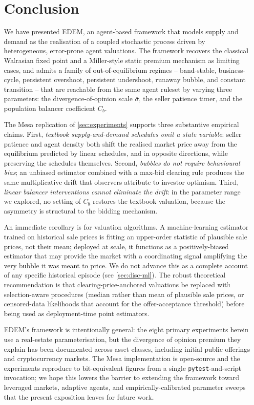 \section{Conclusion}
\label{sec:conclusion}

We have presented EDEM, an agent-based framework that models supply
and demand as the realisation of a coupled stochastic process driven
by heterogeneous, error-prone agent valuations. The framework
recovers the classical Walrasian fixed point and a Miller-style
static premium mechanism as limiting cases, and admits a family of
out-of-equilibrium regimes -- band-stable, business-cycle, persistent
overshoot, persistent undershoot, runaway bubble, and constant
transition -- that are reachable from the same agent ruleset by
varying three parameters: the divergence-of-opinion scale
$\bar{\sigma}$, the seller patience timer, and the population
balancer coefficient $C_{b}$.

The Mesa replication of \cref{sec:experiments}
supports three substantive empirical claims. First,
\emph{textbook supply-and-demand schedules omit a state variable}:
seller patience and agent density both shift the realised market
price away from the equilibrium predicted by linear schedules, and
in opposite directions, while preserving the schedules themselves.
Second, \emph{bubbles do not require behavioural bias}; an unbiased
estimator combined with a max-bid clearing rule produces the same
multiplicative drift that observers attribute to investor optimism.
Third, \emph{linear balancer interventions cannot eliminate the
drift}: in the parameter range we explored, no setting of $C_{b}$
restores the textbook valuation, because the asymmetry is structural
to the bidding mechanism.

An immediate corollary is for valuation algorithms. A
machine-learning estimator trained on historical sale prices is
fitting an upper-order statistic of plausible sale prices, not their
mean; deployed at scale, it functions as a positively-biased
estimator that may provide the market with a coordinating signal
amplifying the very bubble it was meant to price. We do not advance
this as a complete account of any specific historical episode (see
\cref{sec:disc-ml}). The robust theoretical recommendation is that
clearing-price-anchored valuations be replaced with selection-aware
procedures (median rather than mean of plausible sale prices, or
censored-data likelihoods that account for the offer-acceptance
threshold) before being used as deployment-time point estimators.

EDEM's framework is intentionally general: the eight primary experiments
herein use a real-estate parameterisation, but the divergence of
opinion premium they explain has been documented across asset
classes, including initial public offerings
\citep{miller1977,doukas2006} and cryptocurrency markets. The Mesa
implementation is open-source and the experiments reproduce
to bit-equivalent figures from a single \texttt{pytest}-and-script
invocation; we hope this lowers the barrier to extending the
framework toward leveraged markets, adaptive agents, and
empirically-calibrated parameter sweeps that the present
exposition leaves for future work.
